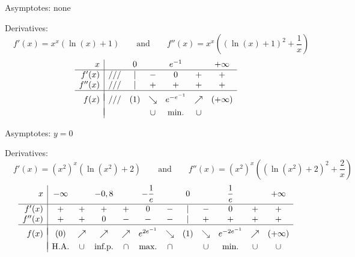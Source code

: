 \begin{Answer}
    	\Question Asymptotes: \quad none\par
    		Derivatives: $\quad f'(x)=x^x(\ln (x)+1)\qquad\mbox{and}\qquad f''(x)=x^x\left((\ln (x) +1)^2+\dfrac{1}{x}\right)$
    		\[ \begin{array}{r|cccccc}
    		x &  & 0 &  & e^{-1} & &+\infty \\
    		\hline
    		f'(x)   & /// & | & - & 0 & + & + \\
    		f''(x)  & /// & | & + & + & + & + \\
    		\hline
    		&&&&&&\vspace{-0.3cm}\\
    		f(x)    & /// & (1) & \searrow & e^{-e^{-1}} & \nearrow & (+\infty)\\
    		&&&&&&\vspace{-0.3cm}\\                                                                              
    		& &  & \cup & \mbox{min.} & \cup &  \\
    		\end{array}\]
    		
    
    	\Question Asymptotes: \quad $y=0$\par
    		Derivatives: $\quad f'(x)=(x^2)^x(\ln (x^2) + 2)\qquad\mbox{and}\qquad f''(x)=(x^2)^x\left(\left(\ln (x^2)+2\right)^2+\dfrac{2}{x}\right)$
    		\[ \begin{array}{r|ccccccccccc}
    		x & -\infty & & -0,8 &  & -\dfrac{1}{e} & & 0 & & \dfrac{1}{e} & &+\infty \\[0.2cm]
    		\hline
    		f'(x)   & + & + & + & + & 0 & - & | & - & 0 & + & +\\
    		f''(x)  & + & + & 0 & - & - & - & | & + & + & + & +\\
    		\hline
    		&&&&&&&&&&&\vspace{-0.3cm}\\
    		f(x)    & (0) & \nearrow & \nearrow & \nearrow & e^{2e^{-1}} & \searrow & (1) & \searrow & e^{-2e^{-1}} & \nearrow & (+\infty)\\
    		&&&&&&&&&&&\vspace{-0.3cm}\\                                                                              
    		& \mbox{H.A.} & \cup & \mbox{inf.p.} & \cap & \mbox{max.} & \cap & & \cup & \mbox{min.} & \cup & \cup \\
    		\end{array}\]
    		

\end{Answer}
